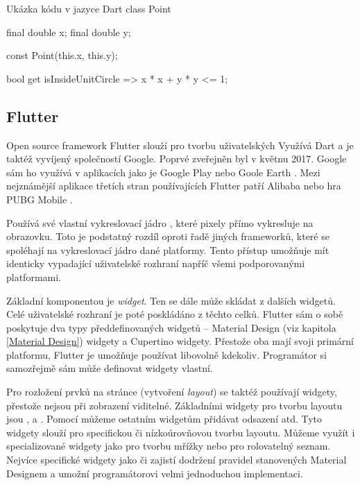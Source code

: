 \documentclass[
  biblatex,
  figures=true,
  tables=false,
  glossaries,
  index
]{kidiplom}
\begin{document}
\begin{kicode}{}{}{Ukázka kódu v jazyce Dart}
class Point {
  final double x;
  final double y;

  const Point(this.x, this.y);

  bool get isInsideUnitCircle => x * x + y * y <= 1;
}
\end{kicode}

\subsection{Flutter}
Open source framework Flutter \cite{flutter} slouží pro tvorbu uživatelských Využívá Dart a je taktéž vyvíjený společností Google. Poprvé zveřejněn byl v květnu 2017. Google sám ho využívá v aplikacích jako je Google Play nebo Goole Earth \cite{flutter-showcase}. Mezi nejznámější aplikace třetích stran používajících Flutter patří Alibaba nebo hra PUBG Mobile \cite{flutter-showcase}.

Používá své vlastní vykreslovací jádro \cite{flutter-architecture}, které pixely přímo vykresluje na obrazovku. Toto je podstatný rozdíl oproti řadě jiných frameworků, které se spoléhají na vykreslovací jádro dané platformy. Tento přístup umožňuje mít identicky vypadající uživatelské rozhraní napříč všemi podporovanými platformami.

Základní komponentou je \textit{widget}. Ten se dále může skládat z dalších widgetů. Celé uživatelské rozhraní je poté poskládáno z těchto celků. Flutter sám o sobě poskytuje dva typy předdefinovaných widgetů -- Material Design (viz kapitola \ref{Material Design}) widgety a Cupertino widgety. Přestože oba mají svoji primární platformu, Flutter je umožňuje používat libovolně kdekoliv. Programátor si samozřejmě sám může definovat widgety vlastní.

Pro rozložení prvků na stránce (vytvoření \textit{layout}) se taktéž používají widgety, přestože nejsou při zobrazení viditelné. Základními widgety pro tvorbu layoutu jsou ,  a . Pomocí  můžeme ostatním widgetům přidávat odsazení atd. Tyto widgety slouží pro specifickou či nízkoúrovňovou tvorbu layoutu. Můžeme využít i specializované widgety jako  pro tvorbu mřížky nebo  pro rolovatelný seznam. Nejvíce specifické widgety jako  či  zajistí dodržení pravidel stanovených Material Designem a umožní programátorovi velmi jednoduchou implementaci.
\end{document}
